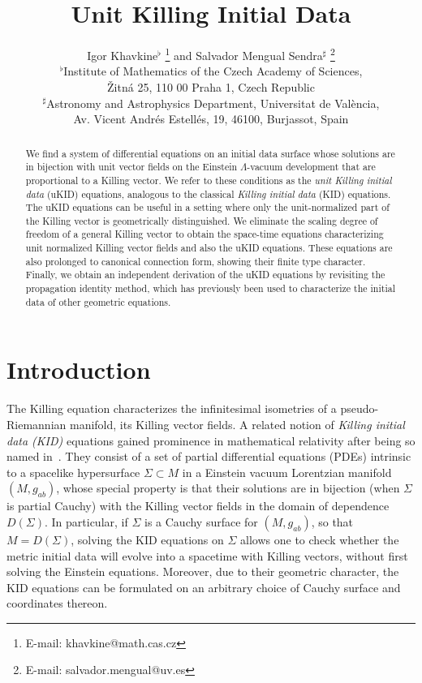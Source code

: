 \documentclass[a4paper]{article}
\title{Unit Killing Initial Data}
\author{%
	Igor Khavkine$^\flat$%
		\thanks{E-mail: khavkine@math.cas.cz}
		{} and
	Salvador Mengual Sendra$^{\sharp}$%
		\thanks{E-mail: salvador.mengual@uv.es}
\\[2ex]
	{\small $^\flat$Institute of Mathematics of the Czech Academy of Sciences,}\\
	{\small \v{Z}itn{\'a} 25, 110 00 Praha 1, Czech Republic}\\
	{\small $^\sharp$Astronomy and Astrophysics Department, Universitat de Val{\`e}ncia, }\\
	{\small  Av. Vicent Andr{\'e}s Estell{\'e}s, 19, 46100, Burjassot, Spain}
}
\date{}
\theoremstyle{remark}
\begin{document}
\maketitle

\begin{abstract}
We find a system of differential equations on an initial data surface
whose solutions are in bijection with unit vector fields on the Einstein
$\Lambda$-vacuum development that are proportional to a Killing vector.
We refer to these conditions as the \textit{unit Killing initial data}
(uKID) equations, analogous to the classical \textit{Killing initial
data} (KID) equations. The uKID equations can be useful in a setting
where only the unit-normalized part of the Killing vector is
geometrically distinguished. We eliminate the scaling degree of freedom
of a general Killing vector to obtain the space-time equations
characterizing unit normalized Killing vector fields and also the uKID
equations. These equations are also prolonged to canonical connection
form, showing their finite type character. Finally, we obtain an
independent derivation of the uKID equations by revisiting the propagation
identity method, which has previously been used to characterize the
initial data of other geometric equations.
\end{abstract}

\section{Introduction}

The Killing equation characterizes the infinitesimal isometries of a
pseudo-Riemannian manifold, its Killing vector fields. A related notion
of \emph{Killing initial data (KID)} equations gained prominence in
mathematical relativity after being so named in~\cite{beig-chrusciel}.
They consist of a set of partial differential equations (PDEs) intrinsic
to a spacelike hypersurface $\Sigma \subset M$ in a Einstein vacuum
Lorentzian manifold $(M,g_{ab})$, whose special property is that their
solutions are in bijection (when $\Sigma$ is partial Cauchy) with the
Killing vector fields in the domain of dependence $D(\Sigma)$. In
particular, if $\Sigma$ is a Cauchy surface for $(M,g_{ab})$, so that $M =
D(\Sigma)$, solving the KID equations on $\Sigma$ allows one to check
whether the metric initial data will evolve into a spacetime with
Killing vectors, without first solving the Einstein equations. Moreover,
due to their geometric character, the KID equations can be formulated on
an arbitrary choice of Cauchy surface and coordinates thereon.
\end{document}
